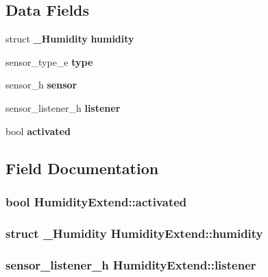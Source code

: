 \subsection*{Data Fields}
\begin{DoxyCompactItemize}
\item 
struct {\bf \-\_\-\-Humidity} {\bfseries humidity}\label{structHumidityExtend_a0b13b697a5a42fd8cc37fc4bc87ed422}

\item 
sensor\-\_\-type\-\_\-e {\bfseries type}\label{structHumidityExtend_aafec809cfaca6f4a2d14d3f64342e7c0}

\item 
sensor\-\_\-h {\bfseries sensor}\label{structHumidityExtend_a6d7661a3475ff4bfca05aea41336cecc}

\item 
sensor\-\_\-listener\-\_\-h {\bfseries listener}\label{structHumidityExtend_a480ccf6d03129fe716fb1cfd12705637}

\item 
bool {\bfseries activated}\label{structHumidityExtend_ad097185bd610a46d28f78aa5ebc9df8f}

\end{DoxyCompactItemize}


\subsection{Field Documentation}
\subsubsection[{activated}]{\setlength{\rightskip}{0pt plus 5cm}bool Humidity\-Extend\-::activated}\label{structHumidityExtend_ad097185bd610a46d28f78aa5ebc9df8f}
\subsubsection[{humidity}]{\setlength{\rightskip}{0pt plus 5cm}struct {\bf \-\_\-\-Humidity} Humidity\-Extend\-::humidity}\label{structHumidityExtend_a0b13b697a5a42fd8cc37fc4bc87ed422}
\subsubsection[{listener}]{\setlength{\rightskip}{0pt plus 5cm}sensor\-\_\-listener\-\_\-h Humidity\-Extend\-::listener}\label{structHumidityExtend_a480ccf6d03129fe716fb1cfd12705637}
